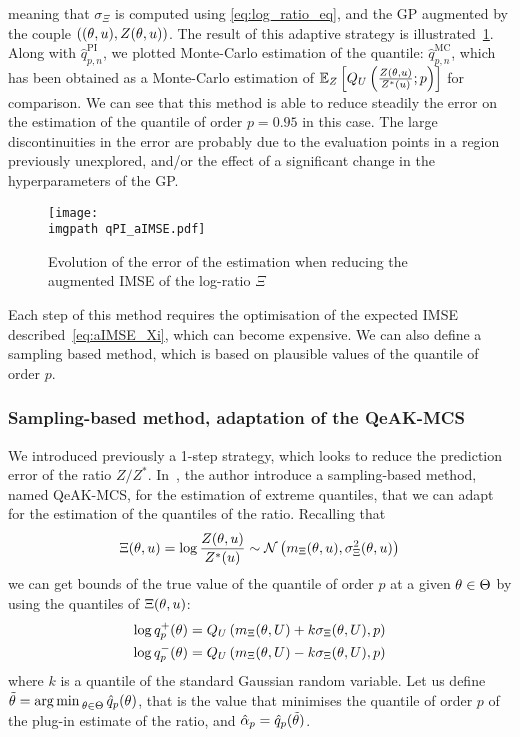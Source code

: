 \documentclass[../../Main_ManuscritThese.tex]{subfiles}
\newcommand\imgpath{/home/victor/acadwriting/Manuscrit/Text/Chapter4/img/}
\begin{document}
meaning that $\sigma_{\Xi}$ is computed using \cref{eq:log_ratio_eq},
and the GP augmented by the couple
$\left((\theta, u), Z(\theta, u)\right)$.  The result of this adaptive
strategy is illustrated~\cref{fig:qPI_aIMSE}. Along with
$\hat{q}_{p,n}^{\mathrm{PI}}$, we plotted Monte-Carlo estimation of
the quantile: $\hat{q}_{p,n}^{\mathrm{MC}}$, which has been obtained
as a Monte-Carlo estimation of
$\mathbb{E}_{Z}\left[Q_{U}\left(\frac{Z(\theta,
      u)}{Z^*(u)};p\right)\right]$ for comparison.  We can see
that this method is able to reduce steadily the error on the
estimation of the quantile of order $p=0.95$ in this case. The large
discontinuities in the error are probably due to the evaluation points
in a region previously unexplored, and/or the effect of a significant
change in the hyperparameters of the GP.
\begin{figure}[ht]
  \centering
  \texttt{[image: \\imgpath qPI\_aIMSE.pdf]}
  \caption[Error of the estimation when reducing the augmented ISME of $\Xi$]{\label{fig:qPI_aIMSE} Evolution of the error of the estimation when reducing the augmented IMSE of the log-ratio $\Xi$}
\end{figure}

Each step of this method requires the optimisation of the expected
IMSE described~\cref{eq:aIMSE_Xi}, which can become expensive. We can also
define a sampling based method, which is based on plausible values of
the quantile of order $p$.

\subsubsection{Sampling-based method, adaptation of the QeAK-MCS}
\label{ssec:quantile_qeakmcs}
We introduced previously a 1-step strategy, which looks to reduce the
prediction error of the ratio
$Z/Z^*$. In~\cite{razaaly_rare_2019,razaaly_quantile-based_2020}, the
author introduce a sampling-based method, named QeAK-MCS, for the estimation of extreme
quantiles, that we can adapt for the estimation of the quantiles of
the ratio.  Recalling that
\begin{equation}
  \Xi(\theta, u) = \log\frac{Z(\theta, u)}{Z^*(u)} \sim \mathcal{N}\left(m_{\Xi}(\theta, u),\sigma^2_{\Xi}(\theta, u)\right)
\end{equation}
we can get bounds of the true value of the quantile of order $p$ at a
given $\theta\in\Theta$ by using the quantiles of $\Xi(\theta, u)$:
\begin{align}
  \log q_p^{+}(\theta) = Q_{U}\left(m_{\Xi}(\theta, U) + k \sigma_{\Xi}(\theta, U), p\right) \\
  \log q_p^{-}(\theta) = Q_{U}\left(m_{\Xi}(\theta, U) - k \sigma_{\Xi}(\theta, U), p\right)
\end{align}
where $k$ is a quantile of the standard Gaussian random variable.  Let us define
$\tilde{\theta}=\operatorname*{arg\,min \,}_{\theta \in\Theta} \hat{q}_p(\theta)$, that is the
value that minimises the quantile of order $p$ of the plug-in estimate
of the ratio, and $\hat{\alpha}_p = \hat{q}_p(\tilde{\theta})$.
\end{document}
